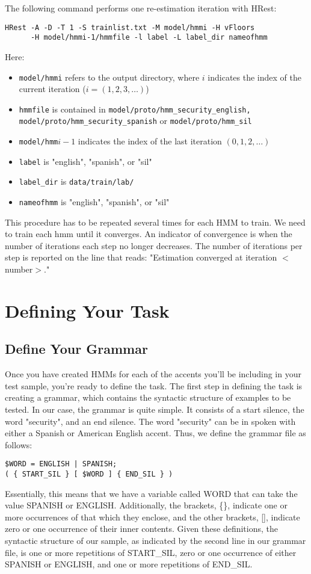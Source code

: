 \documentclass{wileySev}
\begin{document}
The following command performs one re-estimation iteration with HRest:
\begin{verbatim}
HRest -A -D -T 1 -S trainlist.txt -M model/hmmi -H vFloors 
      -H model/hmmi-1/hmmfile -l label -L label_dir nameofhmm
\end{verbatim}
Here:
\begin{itemize}
\item \texttt{model/hmmi} refers to the output directory, where $i$ indicates the index of the current iteration ($i = (1,2,3,\dots)$)
\item \texttt{hmmfile} is contained in \texttt{model/proto/hmm\_security\_english, model/proto/hmm\_security\_spanish} or \texttt{model/proto/hmm\_sil}
\item \texttt{model/hmm$i-1$} indicates the index of the last iteration $(0,1,2,\dots)$
\item \texttt{label} is "english", "spanish", or "sil"
\item \texttt{label\_dir} is  \texttt{data/train/lab/}
\item \texttt{nameofhmm} is "english", "spanish", or "sil"
\end{itemize}
This procedure has to be repeated several times for each HMM to train. We need to train each hmm until it converges. An indicator of convergence is when the number of iterations each step no longer decreases. The number of iterations per step is reported on the line that reads: "Estimation converged at iteration $<$number$>$."

\chapter{Defining Your Task}
\section{Define Your Grammar}
Once you have created HMMs for each of the accents you'll be including in your test sample, you're ready to define the task. The first step in defining the task is creating a grammar, which contains the syntactic structure of examples to be tested. In our case, the grammar is quite simple. It consists of a start silence, the word "security", and an end silence. The word "security" can be in spoken with either a Spanish or American English accent. Thus, we define the grammar file as follows:
\begin{verbatim}
$WORD = ENGLISH | SPANISH;
( { START_SIL } [ $WORD ] { END_SIL } )
\end{verbatim}
Essentially, this means that we have a variable called WORD that can take the value SPANISH or ENGLISH. Additionally, the brackets, \{\}, indicate one or more occurrences of that which they enclose, and the other brackets, [], indicate zero or one occurrence of their inner contents. Given these definitions, the syntactic structure of our sample, as indicated by the second line in our grammar file, is one or more repetitions of START\_SIL, zero or one occurrence of either SPANISH or ENGLISH, and one or more repetitions of END\_SIL.
\end{document}
